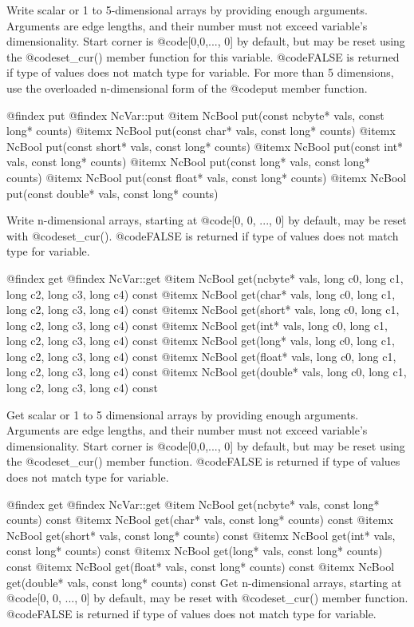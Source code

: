 Write scalar or 1 to 5-dimensional arrays by providing enough arguments.
Arguments are edge lengths, and their number must not exceed variable's
dimensionality.  Start corner is @code{[0,0,..., 0]} by default, but may
be reset using the @code{set_cur()} member function for this variable.
@code{FALSE} is returned if type of values does not match type for
variable.  For more than 5 dimensions, use the overloaded n-dimensional
form of the @code{put} member function.

@findex put
@findex NcVar::put
@item  NcBool put(const ncbyte* vals, const long* counts)
@itemx NcBool put(const char*   vals, const long* counts)
@itemx NcBool put(const short*  vals, const long* counts)
@itemx NcBool put(const int* vals, const long* counts)
@itemx NcBool put(const long* vals, const long* counts)
@itemx NcBool put(const float*  vals, const long* counts)
@itemx NcBool put(const double* vals, const long* counts)

Write n-dimensional arrays, starting at @code{[0, 0, ..., 0]} by
default, may be reset with @code{set_cur()}.  @code{FALSE} is returned
if type of values does not match type for variable.

@findex get
@findex NcVar::get
@item  NcBool get(ncbyte* vals, long c0, long c1, long c2, long c3, long c4) const
@itemx NcBool get(char*   vals, long c0, long c1, long c2, long c3, long c4) const
@itemx NcBool get(short*  vals, long c0, long c1, long c2, long c3, long c4) const
@itemx NcBool get(int* vals, long c0, long c1, long c2, long c3, long c4) const
@itemx NcBool get(long* vals, long c0, long c1, long c2, long c3, long c4) const
@itemx NcBool get(float*  vals, long c0, long c1, long c2, long c3, long c4) const
@itemx NcBool get(double* vals, long c0, long c1, long c2, long c3, long c4) const

Get scalar or 1 to 5 dimensional arrays by providing enough arguments.
Arguments are edge lengths, and their number must not exceed variable's
dimensionality.  Start corner is @code{[0,0,..., 0]} by default, but may
be reset using the @code{set_cur()} member function.  @code{FALSE} is
returned if type of values does not match type for variable.

@findex get
@findex NcVar::get
@item  NcBool get(ncbyte* vals, const long* counts) const
@itemx NcBool get(char*   vals, const long* counts) const
@itemx NcBool get(short*  vals, const long* counts) const
@itemx NcBool get(int* vals, const long* counts) const
@itemx NcBool get(long* vals, const long* counts) const
@itemx NcBool get(float*  vals, const long* counts) const
@itemx NcBool get(double* vals, const long* counts) const
Get n-dimensional arrays, starting at @code{[0, 0, ..., 0]} by default,
may be reset with @code{set_cur()} member function.  @code{FALSE} is
returned if type of values does not match type for variable.


